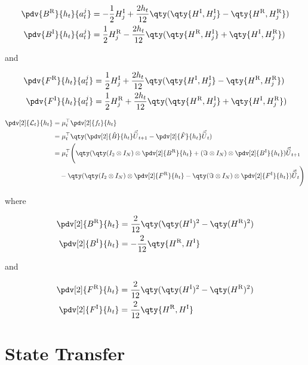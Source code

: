 \documentclass{article}
\newcommand{\isovecU}{\vec{\widetilde{U}}}
\newcommand{\HI}{H^{\text{I}}}
\newcommand{\HR}{H^{\text{R}}}
\newcommand{\BR}{B^{\text{R}}}
\newcommand{\BI}{B^{\text{I}}}
\newcommand{\FR}{F^{\text{R}}}
\newcommand{\FI}{F^{\text{I}}}
\begin{document}
\begin{align*}
  \pdv{\BR}{h_t}{a^j_t} &= -\frac{1}{2}\HI_j + \frac{2h_t}{12}\qty(\qty{\HI, \HI_j} - \qty{\HR, \HR_j})\\
  \pdv{\BI}{h_t}{a^j_t} &= \frac{1}{2}\HR_j - \frac{2h_t}{12}\qty(\qty{\HR, \HI_j} + \qty{\HI, \HR_j})\\
\end{align*}

and

\begin{align*}
  \pdv{\FR}{h_t}{a^j_t} &= \frac{1}{2}\HI_j + \frac{2h_t}{12}\qty(\qty{\HI, \HI_j} - \qty{\HR, \HR_j})\\
  \pdv{\FI}{h_t}{a^j_t} &= \frac{1}{2}\HR_j + \frac{2h_t}{12}\qty(\qty{\HR, \HI_j} + \qty{\HI, \HR_j})\\
\end{align*}

\begin{align*}
  \pdv[2]{\mathcal{L}_t}{h_t} &= \mu_t^\top \pdv[2]{f_t}{h_t} \\
  &= \mu_t^\top \qty(\pdv[2]{\hat B}{h_t} \isovecU_{t+1} - \pdv[2]{\hat F}{h_t} \isovecU_t) \\
  &= \mu_t^\top \Bigg( \qty(\qty(I_2 \otimes I_N) \otimes \pdv[2]{\BR}{h_t} + (\Im \otimes I_N) \otimes \pdv[2]{\BI}{h_t}) \isovecU_{t+1} \\
  & \quad - \qty(\qty(I_2 \otimes I_N) \otimes \pdv[2]{\FR}{h_t} - \qty(\Im \otimes I_N) \otimes \pdv[2]{\FI}{h_t}) \isovecU_t \Bigg) \\
\end{align*}

where

\begin{align*}
  \pdv[2]{\BR}{h_t} &= \frac{2}{12}\qty(\qty(\HI)^2 - \qty(\HR)^2)\\
  \pdv[2]{\BI}{h_t} &= -\frac{2}{12}\qty{\HR, \HI}\\
\end{align*}

and 

\begin{align*}
  \pdv[2]{\FR}{h_t} &= \frac{2}{12}\qty(\qty(\HI)^2 - \qty(\HR)^2)\\
  \pdv[2]{\FI}{h_t} &= \frac{2}{12}\qty{\HR, \HI}\\
\end{align*}


\section{State Transfer}
\end{document}
